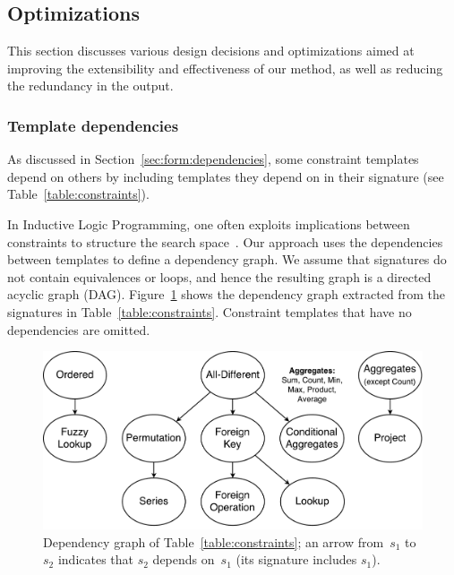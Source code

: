 




\subsection{Optimizations} \label{sec:opts}
This section discusses various design decisions and optimizations aimed at improving the extensibility and effectiveness of our method, as well as reducing the redundancy in the output.

\subsubsection{Template dependencies}
As discussed in Section~\ref{sec:form:dependencies}, some constraint templates depend on others by including templates they depend on in their signature (see Table~\ref{table:constraints}).

In Inductive Logic Programming, one often exploits implications between constraints to structure the search space~\cite{luc_book}.
Our approach uses the dependencies between templates to define a dependency graph.
We assume that signatures do not contain equivalences or loops, and hence the resulting graph is a directed acyclic graph (DAG).
Figure~\ref{fig:learning_order} shows the dependency graph extracted from the signatures in Table~\ref{table:constraints}. 
Constraint templates that have no dependencies are omitted.

\begin{figure}[t]
  \centering
  \includegraphics[width=0.60\linewidth]{figures/constraint_dependency.pdf}
  \caption{Dependency graph of Table~\ref{table:constraints}; an arrow from~$s_1$ to~$s_2$ indicates that $s_2$ depends on~$s_1$ (its signature includes $s_1$).
  }
  \label{fig:learning_order}
\end{figure}

